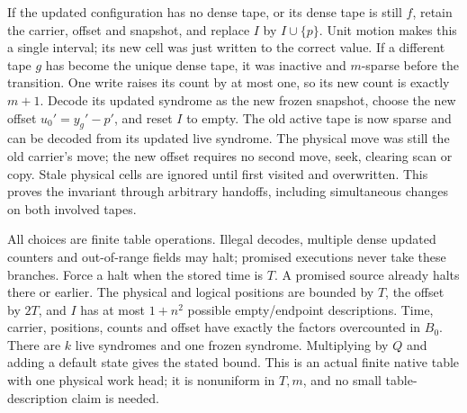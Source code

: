 \begin{informalproof}
If the updated configuration has no dense tape, or its dense tape is still
$f$, retain the carrier, offset and snapshot, and replace $I$ by $I\cup\{p\}$.
Unit motion makes this a single interval; its new cell was just written to
the correct value. If a different tape $g$ has become the unique dense tape,
it was inactive and $m$-sparse before the transition. One write raises its
count by at most one, so its new count is exactly $m+1$. Decode its updated
syndrome as the new frozen snapshot, choose the new offset
$u_0'=y_g'-p'$, and reset $I$ to empty. The old active tape is now sparse
and can be decoded from its updated live syndrome. The physical move was
still the old carrier's move; the new offset requires no second move, seek,
clearing scan or copy. Stale physical cells are ignored until first visited
and overwritten. This proves the invariant through arbitrary handoffs,
including simultaneous changes on both involved tapes.

All choices are finite table operations. Illegal decodes, multiple dense
updated counters and out-of-range fields may halt; promised executions never
take these branches. Force a halt when the stored time is $T$. A promised
source already halts there or earlier. The physical and logical positions
are bounded by $T$, the offset by $2T$, and $I$ has at most $1+n^2$ possible
empty/endpoint descriptions. Time, carrier, positions, counts and offset
have exactly the factors overcounted in $B_0$. There are $k$ live syndromes
and one frozen syndrome. Multiplying by $Q$ and adding a default state gives
the stated bound. This is an actual finite native table with one physical
work head; it is nonuniform in $T,m$, and no small table-description claim
is needed.
\end{informalproof}


